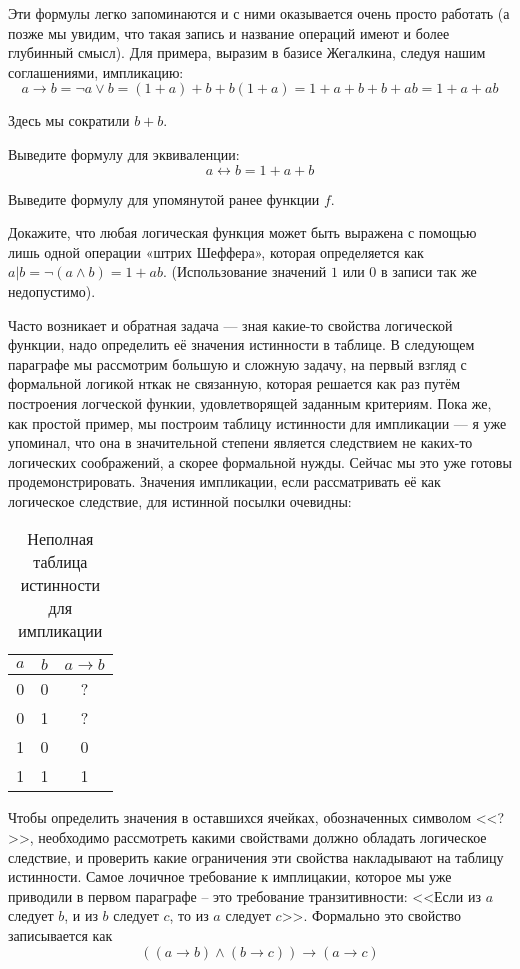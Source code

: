 Эти формулы легко запоминаются и с ними оказывается очень просто работать (а позже мы увидим, что такая запись и название операций имеют и более глубинный смысл). Для примера, выразим в базисе Жегалкина, следуя нашим соглашениями, импликацию: $$a \rightarrow b = \neg a \vee b = (1 + a) + b + b(1 + a) = 1 + a + b + b + ab = 1 + a + ab$$

Здесь мы сократили $b+b$.

\begin{exercise} Выведите формулу для эквиваленции: $$a \leftrightarrow b = 1 + a + b$$\end{exercise}

\begin{exercise} Выведите формулу для упомянутой ранее функции $f$.\end{exercise}

\begin{exercise} Докажите, что любая логическая функция может быть выражена с помощью лишь одной операции «штрих Шеффера», которая определяется как $a|b = \neg(a\wedge b) = 1 + ab$. (Использование значений $1$ или $0$ в записи так же недопустимо).\end{exercise}

Часто возникает и обратная задача --- зная какие-то свойства логической функции, надо определить её значения истинности в таблице. В следующем параграфе мы рассмотрим большую и сложную задачу, на первый взгляд с формальной логикой нткак не связанную, которая решается как раз путём построения логческой функии, удовлетворящей заданным критериям. Пока же, как простой пример, мы построим таблицу истинности для импликации --- я уже упоминал, что она в значительной степени является следствием не каких-то логических соображений, а скорее формальной нужды. Сейчас мы это уже готовы продемонстрировать. Значения импликации, если рассматривать её как логическое следствие, для истинной посылки очевидны:

\begin{table}[h]
\centering
\begin{tabular}{cc|c}
$a$ & $b$ & $a \to b$ \\
\hline
0 & 0 & ? \\
0 & 1 & ? \\
1 & 0 & 0 \\
1 & 1 & 1
\end{tabular}
\caption{Неполная таблица истинности для импликации}
\end{table}

Чтобы определить значения в оставшихся ячейках, обозначенных символом <<?>>, необходимо рассмотреть какими свойствами должно обладать логическое следствие, и проверить какие ограничения эти свойства накладывают на таблицу истинности. Самое лочичное требование к имплицакии, которое мы уже приводили в первом параграфе -- это требование транзитивности: <<Если из $a$ следует $b$, и из $b$ следует $c$, то из $a$ следует $c$>>. Формально это свойство записывается как $$((a\to b) \land (b \to c)) \to (a\to c) $$

